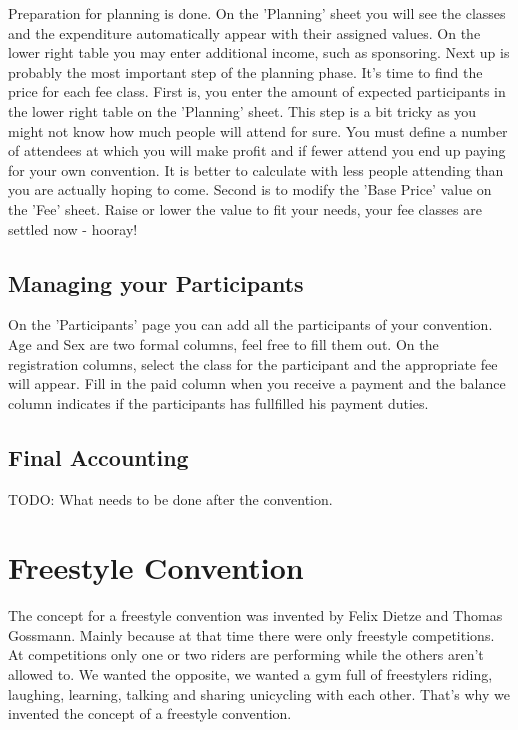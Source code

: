\documentclass[11pt]{report}
\begin{document}
Preparation for planning is done. On the 'Planning' sheet you will see the 
classes and the expenditure automatically appear with their assigned values. On 
the lower right table you may enter additional income, such as sponsoring. Next 
up is probably the most important step of the planning phase. It's time to find 
the price for each fee class. First is, you enter the amount of expected 
participants in the lower right table on the 'Planning' sheet. 
This step is a bit tricky as 
you might not know how much people will attend for sure. You must define a 
number of attendees at which you will make profit and if fewer attend you end up 
paying for your own convention. It is better to calculate with less people 
attending than you are actually hoping to come.
Second is to modify the 'Base Price' value on the 'Fee' sheet. Raise or lower 
the value to fit your needs, your fee classes are settled now - hooray!

\section{Managing your Participants}

On the 'Participants' page you can add all the participants of your convention. 
Age and Sex are two formal columns, feel free to fill them out. On the 
registration columns, select the class for the participant and the appropriate 
fee will appear. Fill in the paid column when you receive a payment and the 
balance column indicates if the participants has fullfilled his payment duties.

\section{Final Accounting}

TODO: What needs to be done after the convention.

\chapter{Freestyle Convention}

The concept for a freestyle convention was invented by Felix Dietze and Thomas 
Gossmann. Mainly because at that time there were only freestyle competitions.
At competitions only one or two riders are performing while the others aren't 
allowed to. We wanted the opposite, we wanted a gym full of freestylers riding, 
laughing, learning, talking and sharing unicycling with each other. That's why 
we invented the concept of a freestyle convention.
\end{document}
